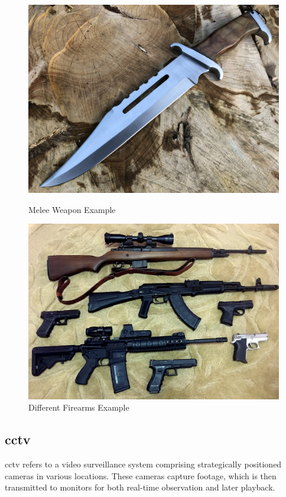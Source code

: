 \begin{figure}[h]
    \centering
    \begin{minipage}{0.45\textwidth}
        \centering
        \includegraphics[width=1\linewidth]{figs/knife.jpg}
        \caption{Melee Weapon Example}
        \label{fig:first_image}
    \end{minipage}\hfill
    \begin{minipage}{0.48\textwidth}
        \centering
        \includegraphics[width=1\linewidth]{figs/firearm.png}
        \caption{Different Firearms Example}
        \label{fig:second_image}
    \end{minipage}
\end{figure}

\subsection{\ac{cctv}}
\ac{cctv} refers to a video surveillance system comprising strategically positioned cameras in various locations. These cameras capture footage, which is then transmitted to monitors for both real-time observation and later playback.

